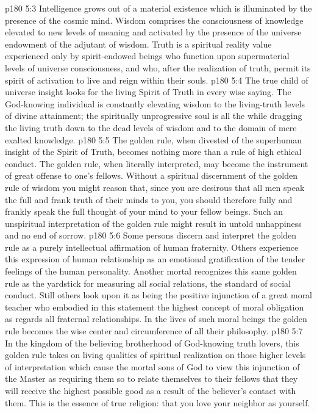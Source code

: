 \vs p180 5:3 Intelligence grows out of a material existence which is illuminated by the presence of the cosmic mind. Wisdom comprises the consciousness of knowledge elevated to new levels of meaning and activated by the presence of the universe endowment of the adjutant of wisdom. Truth is a spiritual reality value experienced only by spirit\hyp{}endowed beings who function upon supermaterial levels of universe consciousness, and who, after the realization of truth, permit its spirit of activation to live and reign within their souls.
\vs p180 5:4 The true child of universe insight looks for the living Spirit of Truth in every wise saying. The God\hyp{}knowing individual is constantly elevating wisdom to the living\hyp{}truth levels of divine attainment; the spiritually unprogressive soul is all the while dragging the living truth down to the dead levels of wisdom and to the domain of mere exalted knowledge.
\vs p180 5:5 The golden rule, when divested of the superhuman insight of the Spirit of Truth, becomes nothing more than a rule of high ethical conduct. The golden rule, when literally interpreted, may become the instrument of great offense to one’s fellows. Without a spiritual discernment of the golden rule of wisdom you might reason that, since you are desirous that all men speak the full and frank truth of their minds to you, you should therefore fully and frankly speak the full thought of your mind to your fellow beings. Such an unspiritual interpretation of the golden rule might result in untold unhappiness and no end of sorrow.
\vs p180 5:6 Some persons discern and interpret the golden rule as a purely intellectual affirmation of human fraternity. Others experience this expression of human relationship as an emotional gratification of the tender feelings of the human personality. Another mortal recognizes this same golden rule as the yardstick for measuring all social relations, the standard of social conduct. Still others look upon it as being the positive injunction of a great moral teacher who embodied in this statement the highest concept of moral obligation as regards all fraternal relationships. In the lives of such moral beings the golden rule becomes the wise center and circumference of all their philosophy.
\vs p180 5:7 In the kingdom of the believing brotherhood of God\hyp{}knowing truth lovers, this golden rule takes on living qualities of spiritual realization on those higher levels of interpretation which cause the mortal sons of God to view this injunction of the Master as requiring them so to relate themselves to their fellows that they will receive the highest possible good as a result of the believer’s contact with them. This is the essence of true religion: that you love your neighbor as yourself.\plusone
